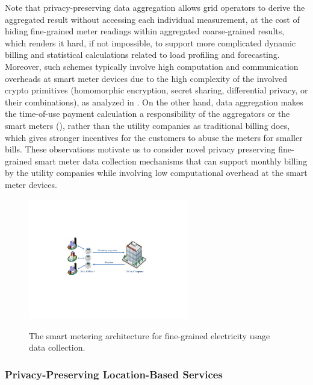 \documentclass[letterpaper,12pt]{article}
\begin{document}
Note that privacy-preserving data aggregation \cite{erkin2013privacy} allows grid operators to derive the aggregated result without accessing each individual measurement, at the cost of hiding fine-grained meter readings within aggregated coarse-grained results, which renders it hard, if not impossible, to support more complicated dynamic billing and statistical calculations related to load profiling and forecasting.  Moreover, such schemes typically involve high computation and communication overheads at smart meter devices due to the high complexity of the involved crypto primitives (homomorphic encryption, secret sharing, differential privacy, or their combinations), as analyzed in \cite{erkin2013privacy}. On the other hand, data aggregation makes the time-of-use payment calculation a responsibility of the aggregators or the smart meters (\cite{rial2011privacy,jawurek2011plug}), rather than the utility companies as traditional billing does, which gives stronger incentives for the customers to abuse the meters for smaller bills.  These observations motivate us to consider novel privacy preserving fine-grained smart meter data collection mechanisms that can support monthly billing by the utility companies while involving low computational overhead at the smart meter devices.

\begin{figure}[t] \centering
  \includegraphics[width=7cm]{Smart_Grid_Architecture1}\\
  \caption{The smart metering architecture for fine-grained electricity usage data collection. } \label{sec:Fig1:Smart_Grid_Architecture1}
\end{figure}

\subsubsection{Privacy-Preserving Location-Based Services} \label{sec:lbs}
\end{document}
